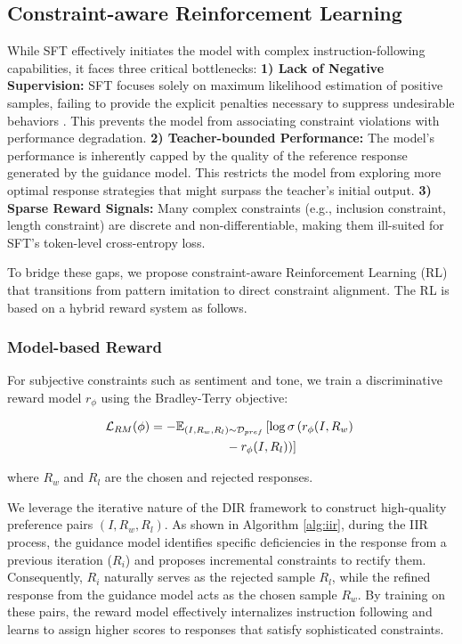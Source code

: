 \subsection{Constraint-aware Reinforcement Learning}
\label{sec:rl}

While SFT effectively initiates the model with complex instruction-following capabilities, it faces three critical bottlenecks: \textbf{1) Lack of Negative Supervision:} SFT focuses solely on maximum likelihood estimation of positive samples, failing to provide the explicit penalties necessary to suppress undesirable behaviors \citep{gudibande2023falsepromiseimitatingproprietary}. This prevents the model from associating constraint violations with performance degradation. \textbf{2) Teacher-bounded Performance:} The model's performance is inherently capped by the quality of the reference response generated by the guidance model. This restricts the model from exploring more optimal response strategies that might surpass the teacher's initial output. \textbf{3) Sparse Reward Signals:} Many complex constraints (e.g., inclusion constraint, length constraint) are discrete and non-differentiable, making them ill-suited for SFT’s token-level cross-entropy loss.

To bridge these gaps, we propose constraint-aware Reinforcement Learning (RL) that transitions from pattern imitation to direct constraint alignment. The RL is based on a hybrid reward system as follows.

\subsubsection{Model-based Reward}

For subjective constraints such as sentiment and tone, we train a discriminative reward model $r_\phi$ using the Bradley-Terry objective:

\begin{equation}
\begin{aligned}
\mathcal{L}_{RM}(\phi)
&= -\mathbb{E}_{(I, R_w, R_l) \sim \mathcal{D}_{pref}}
\left[ \log \sigma \left( r_\phi(I, R_w) \right.\right. \\
&\hspace{5.7em}\left.\left.{} - r_\phi(I, R_l) \right) \right]
\end{aligned}
\end{equation}

\noindent where $R_w$ and $R_l$ are the chosen and rejected responses.

We leverage the iterative nature of the DIR framework to construct high-quality preference pairs $(I, R_w, R_l)$. As shown in Algorithm \ref{alg:iir}, during the IIR process, the guidance model identifies specific deficiencies in the response from a previous iteration ($R_i$) and proposes incremental constraints to rectify them. Consequently, $R_i$ naturally serves as the rejected sample $R_l$, while the refined response from the guidance model acts as the chosen sample $R_w$. By training on these pairs, the reward model effectively internalizes instruction following and learns to assign higher scores to responses that satisfy sophisticated constraints.

